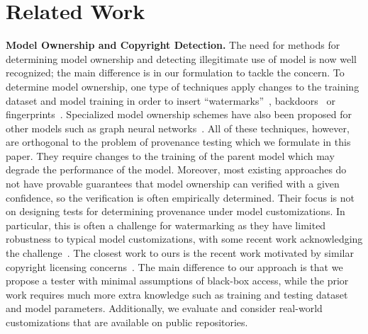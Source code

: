 \section{Related Work}


\vspace{10pt}
\noindent
\textbf{Model Ownership and Copyright Detection.}
The need for methods for determining model ownership and detecting illegitimate use of model is now well recognized; the main difference is in our formulation to tackle the concern. To determine model ownership, one type of techniques apply changes to the training dataset and model training in order to insert ``watermarks''~\cite{jia2021entangled,shao2024explanation,yan2023rethinking},  backdoors~\cite{peng2023you,adi2018turning} or fingerprints~\cite{xu2024instructional,cao2021ipguard,peng2022fingerprinting,lukasdeep}.
Specialized model ownership schemes have also been proposed for other models such as graph neural networks~\cite{zhou2024revisiting, waheed2024grove}.
All of these techniques, however, are orthogonal to the problem of provenance testing which we formulate in this paper. They require changes to the training of the parent model which may degrade the performance of the model. Moreover, most existing approaches do not have provable guarantees that model ownership can verified with a given confidence, so the verification is often empirically determined. 
Their focus is not on designing tests for determining provenance under model customizations. In particular, this is often a challenge for watermarking as they have limited robustness to typical model customizations, with some recent work acknowledging the challenge~\cite{krauss2024clearstamp}.
The closest work to ours is the recent work motivated by similar copyright licensing concerns~\cite{chen2022copy}. The main difference to our approach is that we propose a tester with minimal assumptions of black-box access, while the prior work requires much more extra knowledge such as training and testing dataset and model parameters. Additionally, we evaluate and consider real-world customizations that are available on public repositories.
%
%


